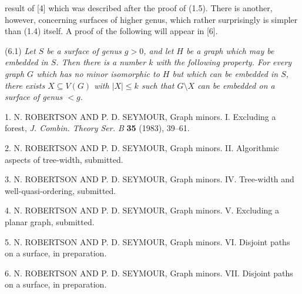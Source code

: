 \noindent result of [4] which was described after the proof of (1.5). There is another, however, concerning surfaces of higher genus, which rather surprisingly is simpler than (1.4) itself. A proof of the following will appear in [6].

\stmt
(6.1) \textit{Let $S$ be a surface of genus $g > 0$, and let $H$ be a graph which may be embedded in $S$. Then there is a number $k$ with the following property. For every graph $G$ which has no minor isomorphic to $H$ but which can be embedded in $S$, there exists $X \subseteq V(G)$ with $|X| \le k$ such that $G \setminus X$ can be embedded on a surface of genus $<g$.}


1. N. ROBERTSON AND P. D. SEYMOUR, Graph minors. I. Excluding a forest, \textit{J. Combin. Theory Ser. B} \textbf{35} (1983), 39--61.

2. N. ROBERTSON AND P. D. SEYMOUR, Graph minors. II. Algorithmic aspects of tree-width, submitted.

3. N. ROBERTSON AND P. D. SEYMOUR, Graph minors. IV. Tree-width and well-quasi-ordering, submitted.

4. N. ROBERTSON AND P. D. SEYMOUR, Graph minors. V. Excluding a planar graph, submitted.

5. N. ROBERTSON AND P. D. SEYMOUR, Graph minors. VI. Disjoint paths on a surface, in preparation.

6. N. ROBERTSON AND P. D. SEYMOUR, Graph minors. VII. Disjoint paths on a surface, in preparation.
